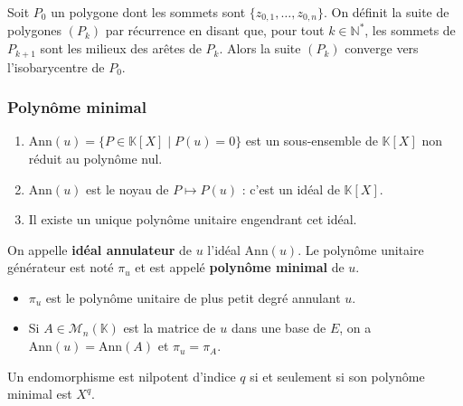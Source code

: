   \begin{application}
    Soit $P_0$ un polygone dont les sommets sont $\{ z_{0,1}, \dots, z_{0,n} \}$. On définit la suite de polygones $(P_k)$ par récurrence en disant que, pour tout $k \in \mathbb{N}^*$, les sommets de $P_{k+1}$ sont les milieux des arêtes de $P_k$.
    \newpar
    Alors la suite $(P_k)$ converge vers l'isobarycentre de $P_0$.
  \end{application}

  \subsubsection{Polynôme minimal}


  \begin{lemma}
    \begin{enumerate}[label={\bfseries(\roman*)}]
      \item $\mathrm{Ann}(u) = \{ P \in \mathbb{K}[X] \mid P(u) = 0 \}$ est un sous-ensemble de $\mathbb{K}[X]$ non réduit au polynôme nul.
      \item $\mathrm{Ann}(u)$ est le noyau de $P \mapsto P(u)$ : c'est un idéal de $\mathbb{K}[X]$.
      \item Il existe un unique polynôme unitaire engendrant cet idéal.
    \end{enumerate}
  \end{lemma}

  \begin{definition}
    On appelle \textbf{idéal annulateur} de $u$ l'idéal $\mathrm{Ann}(u)$. Le polynôme unitaire générateur est noté $\pi_u$ et est appelé \textbf{polynôme minimal} de $u$.
  \end{definition}

  \begin{remark}
    \begin{itemize}
      \item $\pi_u$ est le polynôme unitaire de plus petit degré annulant $u$.
      \item Si $A \in \mathcal{M}_n(\mathbb{K})$ est la matrice de $u$ dans une base de $E$, on a $\mathrm{Ann}(u) = \mathrm{Ann}(A)$ et $\pi_u = \pi_A$.
    \end{itemize}
  \end{remark}

  \begin{example}
    Un endomorphisme est nilpotent d'indice $q$ si et seulement si son polynôme minimal est $X^q$.
  \end{example}


